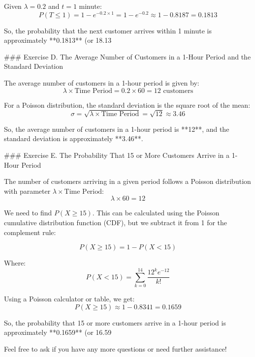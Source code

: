 Given $\lambda = 0.2$ and $ t = 1 $ minute:
$$P(T \leq 1) = 1 - e^{-0.2 \times 1} = 1 - e^{-0.2} \approx 1 - 0.8187 = 0.1813$$

So, the probability that the next customer arrives within 1 minute is approximately **0.1813** (or 18.13%

### Exercise D. 
The Average Number of Customers in a 1-Hour Period and the Standard Deviation

The average number of customers in a 1-hour period is given by:
$$\lambda \times \text{Time Period} = 0.2 \times 60 = 12 \text{ customers}$$

For a Poisson distribution, the standard deviation is the square root of the mean:
$$\sigma = \sqrt{\lambda \times \text{Time Period}} = \sqrt{12} \approx 3.46$$

So, the average number of customers in a 1-hour period is **12**, and the standard deviation is approximately **3.46**.

### Exercise E. 
The Probability That 15 or More Customers Arrive in a 1-Hour Period

The number of customers arriving in a given period follows a Poisson distribution with parameter $\lambda \times \text{Time Period}$:
$$\lambda \times 60 = 12$$

We need to find $ P(X \geq 15) $. This can be calculated using the Poisson cumulative distribution function (CDF), but we subtract it from 1 for the complement rule:

$$P(X \geq 15) = 1 - P(X < 15)$$

Where:
$$P(X < 15) = \sum_{k=0}^{14} \frac{12^k e^{-12}}{k!}$$

Using a Poisson calculator or table, we get:
$$P(X \geq 15) \approx 1 - 0.8341 = 0.1659$$

So, the probability that 15 or more customers arrive in a 1-hour period is approximately **0.1659** (or 16.59%

Feel free to ask if you have any more questions or need further assistance!